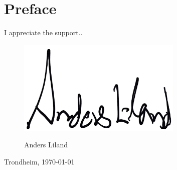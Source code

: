 \chapter*{Preface}\label{sec:preface}

I appreciate the support..

\begin{figure}[H]
    \begin{minipage}{.33\textwidth}
		\centering
		\includegraphics[width = 0.7\textwidth]{images/signature_anders}
		\end{minipage}%
    \vfill
    	\begin{minipage}{.33\textwidth}
		\centering
		\end{minipage}%
    \hfill
        \vfill
    	\begin{minipage}{.33\textwidth}
    	\centering
        Anders Liland \\

		\end{minipage}%
\end{figure}

		Trondheim, \today




